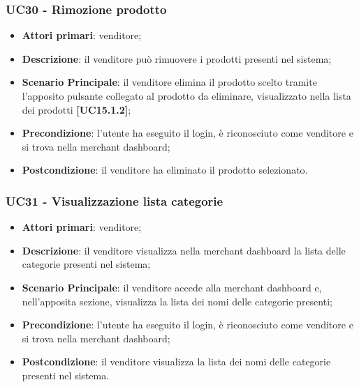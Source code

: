 \subsubsection{UC30 - Rimozione prodotto}
\begin{itemize}
\item \textbf{Attori primari}: venditore;
\item \textbf{Descrizione}: il venditore può rimuovere i prodotti presenti nel sistema;
\item \textbf{Scenario Principale}: il venditore elimina il prodotto scelto tramite l'apposito pulsante collegato al prodotto da eliminare, visualizzato nella lista dei prodotti \textbf{[UC15.1.2]};
\item \textbf{Precondizione}: l'utente ha eseguito il login, è riconosciuto come venditore e si trova nella merchant dashboard;
\item \textbf{Postcondizione}: il venditore ha eliminato il prodotto selezionato.
\end{itemize}

\subsubsection{UC31 - Visualizzazione lista categorie}
\begin{itemize}
\item \textbf{Attori primari}: venditore;
\item \textbf{Descrizione}: il venditore visualizza nella merchant dashboard la lista delle categorie presenti nel sistema;
\item \textbf{Scenario Principale}: il venditore accede alla merchant dashboard e, nell'apposita sezione, visualizza la lista dei nomi delle categorie presenti;
\item \textbf{Precondizione}: l'utente ha eseguito il login, è riconosciuto come venditore e si trova nella merchant dashboard;
\item \textbf{Postcondizione}: il venditore visualizza la lista dei nomi delle categorie presenti nel sistema.
\end{itemize}

